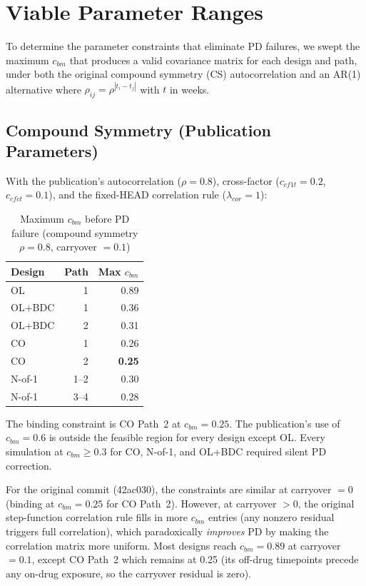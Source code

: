 \documentclass[11pt]{article}
\begin{document}
\section{Viable Parameter Ranges}

To determine the parameter constraints that eliminate PD
failures, we swept the maximum $c_{bm}$ that produces a
valid covariance matrix for each design and path, under both
the original compound symmetry (CS) autocorrelation and an
AR(1) alternative where
$\rho_{ij} = \rho^{|t_i - t_j|}$ with $t$ in weeks.

\subsection{Compound Symmetry (Publication Parameters)}

With the publication's autocorrelation ($\rho = 0.8$),
cross-factor ($c_{cf1t} = 0.2$, $c_{cfct} = 0.1$), and the
fixed-HEAD correlation rule ($\lambda_{cor} = 1$):

\begin{table}[h]
\centering
\caption{Maximum $c_{bm}$ before PD failure (compound symmetry
  $\rho = 0.8$, carryover $= 0.1$)}
\begin{tabular}{lrr}
\toprule
Design & Path & Max $c_{bm}$ \\
\midrule
OL & 1 & 0.89 \\
OL+BDC & 1 & 0.36 \\
OL+BDC & 2 & 0.31 \\
CO & 1 & 0.26 \\
CO & 2 & \textbf{0.25} \\
N-of-1 & 1--2 & 0.30 \\
N-of-1 & 3--4 & 0.28 \\
\bottomrule
\end{tabular}
\end{table}

The binding constraint is CO Path~2 at $c_{bm} = 0.25$. The
publication's use of $c_{bm} = 0.6$ is outside the feasible
region for every design except OL. Every simulation at
$c_{bm} \geq 0.3$ for CO, N-of-1, and OL+BDC required
silent PD correction.

For the original commit (42ac030), the constraints are
similar at carryover $= 0$ (binding at $c_{bm} = 0.25$ for
CO Path~2). However, at carryover $> 0$, the original
step-function correlation rule fills in more $c_{bm}$ entries
(any nonzero residual triggers full correlation), which
paradoxically \emph{improves} PD by making the correlation
matrix more uniform. Most designs reach $c_{bm} = 0.89$ at
carryover $= 0.1$, except CO Path~2 which remains at 0.25
(its off-drug timepoints precede any on-drug exposure, so the
carryover residual is zero).
\end{document}
